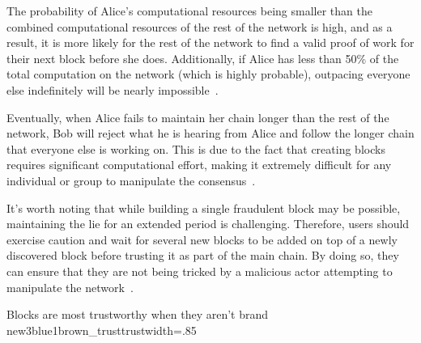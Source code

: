 The probability of Alice's computational resources being smaller than the combined computational resources of the rest of the network is
high, and as a result, it is more likely for the rest of the network to find a valid proof of work for their next block before she does.
Additionally, if Alice has less than 50\% of the total computation on the network (which is highly probable), outpacing everyone else
indefinitely will be nearly impossible~\cite{nakamoto2008bitcoin}.

Eventually, when Alice fails to maintain her chain longer than the rest of the network, Bob will reject what he is hearing from Alice
and follow the longer chain that everyone else is working on. This is due to the fact that creating blocks requires significant computational
effort, making it extremely difficult for any individual or group to manipulate the consensus~\cite{szabo2005bit}.

It's worth noting that while building a single fraudulent block may be possible, maintaining the lie for an extended period is
challenging. Therefore, users should exercise caution and wait for several new blocks to be added on top of a newly discovered
block before trusting it as part of the main chain. By doing so, they can ensure that they are not being tricked by a malicious
actor attempting to manipulate the network~\cite{dupont2019cryptocurrencies}.

{Blocks are most trustworthy when they aren't brand new}{3blue1brown_trust}{trust}{width=.85\textwidth}%
